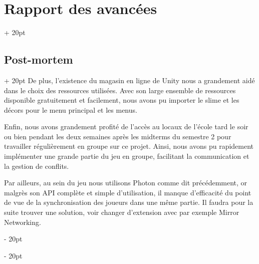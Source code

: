 \documentclass[a4paper, 12pt, twoside]{article}
\newcommand{\ind}[1][20pt]{\advance\leftskip + #1}
\newcommand{\deind}[1][20pt]{\advance\leftskip - #1}
\newenvironment{indt}[2][20pt]{#2 \par \ind[#1]}{\par \deind} %
\begin{document}
\begin{indt}{\section{Rapport des avancées}}
\begin{indt}{\subsection{Post-mortem}}
            De plus, l'existence du magasin en ligne de Unity nous a grandement aidé dans le choix des ressources utilisées. Avec son large ensemble de ressources disponible gratuitement et facilement, nous avons pu importer le slime et les décors pour le menu principal et les menus.

            Enfin, nous avons grandement profité de l'accès au locaux de l'école tard le soir ou bien pendant les deux semaines après les midterms du semestre 2 pour travailler régulièrement en groupe sur ce projet. Ainsi, nous avons pu rapidement implémenter une grande partie du jeu en groupe, facilitant la communication et la gestion de conflits.

            Par ailleurs, au sein du jeu nous utilisons Photon comme dit précédemment, or malgrès son API complète et simple d'utilisation, il manque d'efficacité du point de vue de la synchronisation des joueurs dans une même partie. Il faudra pour la suite trouver une solution, voir changer d'extension avec par exemple Mirror Networking.

        \end{indt}
    \end{indt}

    \newpage
\end{document}
